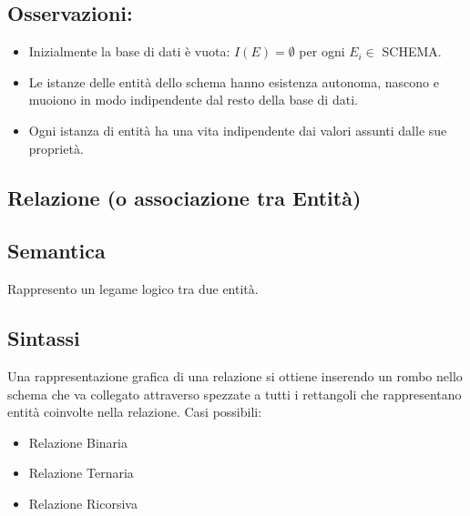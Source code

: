 \documentclass[a4paper, 10pt]{article}
\theoremstyle{definition}
\begin{document}
			\subsection*{Osservazioni:}
				\begin{itemize}
					\item Inizialmente la base di dati è vuota: $I(E) = \emptyset$ per ogni 
					$ E_i \in$ SCHEMA.
					\item Le istanze delle entità dello schema hanno esistenza autonoma, nascono e muoiono in modo indipendente dal resto della base di dati.
					\item Ogni istanza di entità ha una vita indipendente dai valori assunti dalle sue proprietà.
				\end{itemize}
		\newpage
			\subsection{Relazione (o associazione tra Entità)}
				\subsection*{Semantica}
					Rappresento un legame logico tra due entità.
				\subsection*{Sintassi}
					Una rappresentazione grafica di una relazione si ottiene inserendo un rombo nello schema che va collegato attraverso spezzate a tutti i rettangoli che rappresentano entità coinvolte nella relazione.
					Casi possibili:
					\begin{itemize}
						\item Relazione Binaria
						
						
						\item Relazione Ternaria
						
						\item Relazione Ricorsiva
						
						
					\end{itemize}
\end{document}
